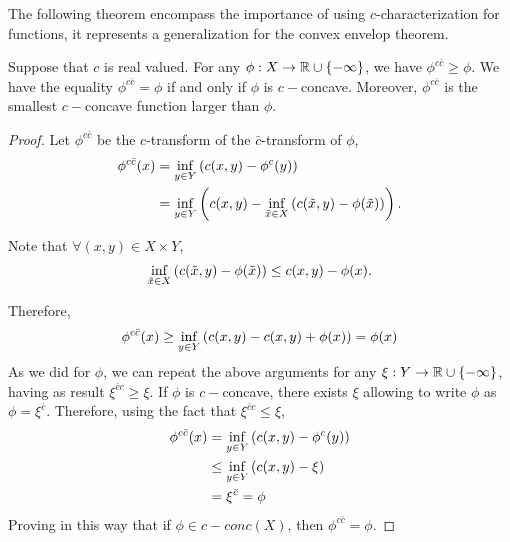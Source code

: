The following theorem encompass the importance of using $c$-characterization for functions, it represents a generalization for the convex envelop theorem.
\begin{theorem}\label{th: C-concave envelope}
Suppose that $c$ is real valued. For any $\phi: X\rightarrow \mathbb{R}\cup \left\lbrace -\infty \right\rbrace$, we have $\phi^{c\bar c}\geq \phi$. We have the equality $\phi^{c\bar c}=\phi$ if and only if $\phi$ is $c-$concave. Moreover, $\phi^{c\bar c}$ is the smallest $c-$concave function larger than $\phi$.
\end{theorem}
\begin{proof}
	Let $\phi^{c\bar {c}}$ be the $c$-transform of the $\bar{c}$-transform of $\phi$,
	\begin{align*}
		\phi^{c\bar c}(x)&=\inf_{y\in Y} \left( c(x,y)-\phi^{c}(y) \right)\\
		&=\inf_{y\in Y} \left( c(x,y)-\inf_{\tilde x\in X}\left( c(\tilde x,y)-\phi(\tilde x) \right) \right).
	\end{align*}
	
	Note that $\forall (x, y) \in X\times Y$,
	\begin{equation*}
		\inf_{\tilde x \in X}\left(  c(\tilde x,y)-\phi(\tilde x)  \right)\leq c(x, y) - \phi (x).
	\end{equation*}
	
	Therefore, 
	\begin{equation*}
		\phi^{c\bar c}(x)\geq \inf_{y\in Y}\left( c(x,y)-c(x,y)+\phi(x) \right)=\phi(x)
	\end{equation*}
	As we did for $\phi$, we can repeat the above arguments for any $\xi:Y\rightarrow \mathbb{R}\cup\left\lbrace -\infty \right\rbrace$, having as result $\xi^{\bar{c}c}\geq\xi$. 
	If $\phi$ is $c-$concave, there exists $\xi$ allowing to write $\phi$ as $\phi=\xi^{\bar{c}}$.  Therefore, using the fact that $\xi^{\bar{c}c}\leq \xi$, 
	\begin{align*}
		\phi^{c\bar c}(x)&=\inf_{y\in Y} \left( c(x,y)-\phi^c(y) \right)\\
						&\leq \inf_{y\in Y}\left( c(x,y)-\xi \right)
						\\
						&=\xi^{\bar{c}}=\phi
	\end{align*}
	Proving in this way that if $\phi \in c-conc(X)$, then $\phi^{c\bar c}= \phi$.


\end{proof}
